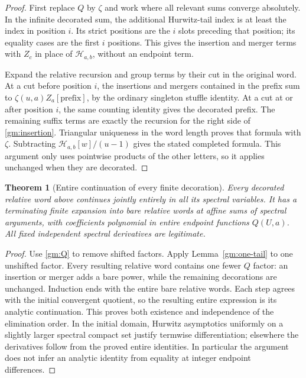 \documentclass[11pt,a4paper]{article}
\numberwithin{equation}{section}
\newtheorem{theorem}{Theorem}[section]
\theoremstyle{definition}
\theoremstyle{remark}
\begin{document}
\begin{proof}
First replace \(Q\) by \(\zeta\) and work where all relevant sums
converge absolutely.  In the infinite decorated sum, the additional
Hurwitz-tail index is at least the index in position \(i\).  Its strict
positions are the \(i\) slots preceding that position; its equality
cases are the first \(i\) positions.  This gives the insertion and
merger terms with \(Z_c\) in place of \(\mathcal H_{a,b}\), without
an endpoint term.

Expand the relative recursion and group terms by their cut in the
original word.  At a cut before position \(i\), the insertions and
mergers contained in the prefix sum to
\(\zeta(u,a)Z_a[\text{prefix}]\), by the ordinary singleton stuffle
identity.  At a cut at or after position \(i\), the same counting
identity gives the decorated prefix.  The remaining suffix terms are
exactly the recursion for the right side of \eqref{gm:insertion}.
Triangular uniqueness in the word length proves that formula with
\(\zeta\).  Subtracting \(\mathcal H_{a,b}[w]/(u-1)\) gives the
stated completed formula.  This argument only uses pointwise products
of the other letters, so it applies unchanged when they are decorated.
\end{proof}

\begin{theorem}[Entire continuation of every finite decoration]
\label{gm:closure}
Every decorated relative word above continues jointly entirely in all
its spectral variables.  It has a terminating finite expansion into
bare relative words at affine sums of spectral arguments, with
coefficients polynomial in entire endpoint functions \(Q(U,a)\).
All fixed independent spectral derivatives are legitimate.
\end{theorem}

\begin{proof}
Use \eqref{gm:Q} to remove shifted factors.  Apply
Lemma~\ref{gm:one-tail} to one unshifted factor.  Every resulting
relative word contains one fewer \(Q\) factor: an insertion or merger
adds a bare power, while the remaining decorations are unchanged.
Induction ends with the entire bare relative words.  Each step agrees
with the initial convergent quotient, so the resulting entire expression
is its analytic continuation.  This proves both existence and
independence of the elimination order.  In the initial domain, Hurwitz
asymptotics uniformly on a slightly larger spectral compact set justify
termwise differentiation; elsewhere the derivatives follow from the
proved entire identities.  In particular the argument does not infer an
analytic identity from equality at integer endpoint differences.
\end{proof}
\end{document}
